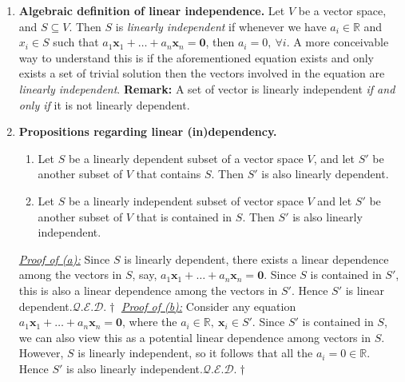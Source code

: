 \documentclass[oneside, 12pt]{book}
\newcommand{\settag}[1]{\renewcommand{\theenumi}{#1}}
\newcommand{\R}{\mathbb{R}}
\newcommand{\qed}{\hfill $\mathcal{Q}.\mathcal{E}.\mathcal{D}.\dagger$}
\newcommand{\tbf}[1]{\textbf{#1}}
\newcommand{\tit}[1]{\textit{#1}}
\begin{document}
\begin{enumerate}
        \settag{1.4.4}
        \item \textbf{Algebraic definition of linear independence.} Let $V$ be a vector space, and $S\subseteq V$. Then $S$ is \textit{linearly independent} if whenever we have $a_i\in \R$ and $x_i\in S$ such that $a_1\mathbf{x}_1+\ldots+a_n\mathbf{x}_n = \mathbf{0}$, then $a_i = 0,~\forall i$. A more conceivable way to understand this is if the aforementioned equation exists and only exists a set of trivial solution then the vectors involved in the equation are \textit{linearly independent}. \newline \tbf{Remark: }A set of vector is linearly independent \tit{if and only if} it is not linearly dependent.
        
        \settag{1.4.7}
        \item \textbf{Propositions regarding linear (in)dependency.}
            \begin{enumerate}
                \item Let $S$ be a linearly dependent subset of a vector space $V$, and let $S'$ be another subset of $V$ that contains $S$. Then $S'$ is also linearly dependent.
                \item Let $S$ be a linearly independent subset of vector space $V$ and let $S'$ be another subset of $V$ that is contained in $S$. Then $S'$ is also linearly independent.
            \end{enumerate}
        \underline{\tit{Proof of (a):}}
        Since $S$ is linearly dependent, there exists a linear dependence among the vectors in $S$, say, $a_1\mathbf{x}_1 + \ldots+ a_n\mathbf{x}_n = \mathbf{0}$. Since $S$ is contained in $S'$, this is also a linear dependence among the vectors in $S'$. Hence $S'$ is linear dependent.\qed\newline
        \underline{\tit{Proof of (b):}}
        Consider any equation $a_1\mathbf{x}_1 + \ldots+ a_n\mathbf{x}_n = \mathbf{0}$, where the $a_i \in \R,~\mathbf{x}_i \in S'$. Since $S'$ is contained in $S$, we can also view this as a potential linear dependence among vectors in $S$. However, $S$ is linearly independent, so it follows that all the $a_i = 0\in \R$. Hence $S'$ is also linearly independent.\qed
        

\end{enumerate}
\end{document}
